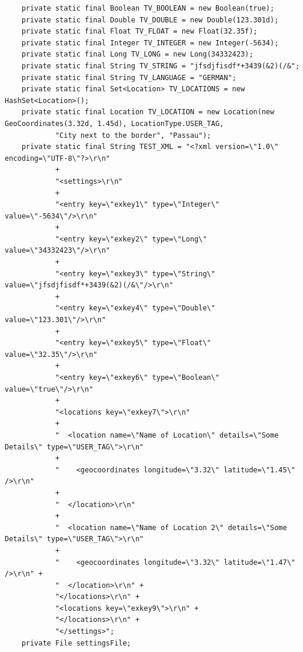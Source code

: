 \documentclass[10pt]{scrreprt}
\begin{document}
\begin{lstlisting}
    private static final Boolean TV_BOOLEAN = new Boolean(true);
    private static final Double TV_DOUBLE = new Double(123.301d);
    private static final Float TV_FLOAT = new Float(32.35f);
    private static final Integer TV_INTEGER = new Integer(-5634);
    private static final Long TV_LONG = new Long(34332423);
    private static final String TV_STRING = "jfsdjfisdf*+3439(&2)(/&";
    private static final String TV_LANGUAGE = "GERMAN";
    private static final Set<Location> TV_LOCATIONS = new HashSet<Location>();
    private static final Location TV_LOCATION = new Location(new GeoCoordinates(3.32d, 1.45d), LocationType.USER_TAG,
            "City next to the border", "Passau");
    private static final String TEST_XML = "<?xml version=\"1.0\" encoding=\"UTF-8\"?>\r\n"
            +
            "<settings>\r\n"
            +
            "<entry key=\"exkey1\" type=\"Integer\" value=\"-5634\"/>\r\n"
            +
            "<entry key=\"exkey2\" type=\"Long\" value=\"34332423\"/>\r\n"
            +
            "<entry key=\"exkey3\" type=\"String\" value=\"jfsdjfisdf*+3439(&2)(/&\"/>\r\n"
            +
            "<entry key=\"exkey4\" type=\"Double\" value=\"123.301\"/>\r\n"
            +
            "<entry key=\"exkey5\" type=\"Float\" value=\"32.35\"/>\r\n"
            +
            "<entry key=\"exkey6\" type=\"Boolean\" value=\"true\"/>\r\n"
            +
            "<locations key=\"exkey7\">\r\n"
            +
            "  <location name=\"Name of Location\" details=\"Some Details\" type=\"USER_TAG\">\r\n"
            +
            "    <geocoordinates longitude=\"3.32\" latitude=\"1.45\" />\r\n"
            +
            "  </location>\r\n"
            +
            "  <location name=\"Name of Location 2\" details=\"Some Details\" type=\"USER_TAG\">\r\n"
            +
            "    <geocoordinates longitude=\"3.32\" latitude=\"1.47\" />\r\n" +
            "  </location>\r\n" +
            "</locations>\r\n" +
            "<locations key=\"exkey9\">\r\n" +
            "</locations>\r\n" +
            "</settings>";
    private File settingsFile;



\end{lstlisting}
\end{document}
